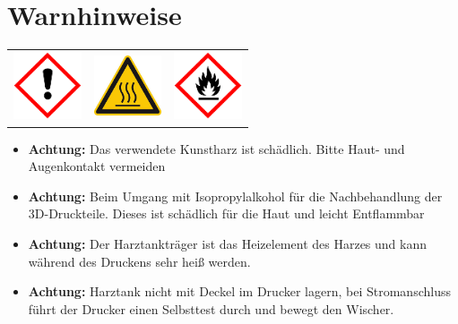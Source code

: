 \documentclass{\basedir/fablab-document}
\begin{document}
\section{Warnhinweise}
\begin{table}[h]
	\centering
	\begin{tabular}{ccc}
		
		\includegraphics[width=2cm]{bilder/GHSa.png}  &
		\includegraphics[width=2cm]{bilder/GHShs.jpg}  & \includegraphics[width=2cm]{bilder/GHSf.png} \\
	\end{tabular}
\end{table}

\begin{itemize}
	\item \textbf{Achtung:} Das verwendete Kunstharz ist schädlich. Bitte Haut- und Augenkontakt vermeiden \\
	\item \textbf{Achtung:} Beim Umgang mit Isopropylalkohol für die Nachbehandlung der 3D-Druckteile. Dieses ist schädlich für die Haut und leicht Entflammbar\\
	
	\item \textbf{Achtung:} Der Harztankträger ist das Heizelement des Harzes und kann während des Druckens sehr heiß werden.
	
	\item \textbf{Achtung:}
	Harztank nicht mit Deckel im Drucker lagern, bei Stromanschluss führt der Drucker einen Selbsttest durch und bewegt den Wischer.
\end{itemize}
\end{document}
